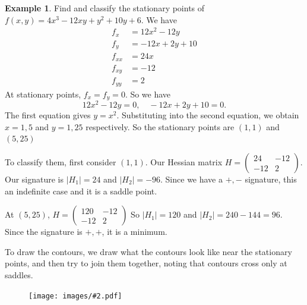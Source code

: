 \documentclass[a4paper]{article}
\theoremstyle{definition}
\newtheorem*{eg}{Example}
\newcommand{\img}[2][]{\begin{figure}[ht]\centering\texttt{[image: images/\#2.pdf]}\end{figure}}
\begin{document}
\begin{eg}
  Find and classify the stationary points of $f(x, y) = 4x^3 - 12xy + y^2 + 10y + 6$. We have
  \begin{align*}
    f_x &= 12x^2 - 12y\\
    f_y &= -12x + 2y + 10\\
    f_{xx} &= 24x\\
    f_{xy} &= -12\\
    f_{yy} &= 2
  \end{align*}
  At stationary points, $f_x = f_y = 0$. So we have
  \[
  12x^2 - 12y = 0,\quad -12x + 2y + 10 = 0.
  \]
  The first equation gives $y = x^2$. Substituting into the second equation, we obtain $x = 1, 5$ and $y = 1, 25$ respectively. So the stationary points are $(1, 1)$ and $(5, 25)$

  To classify them, first consider $(1, 1)$. Our Hessian matrix $H = 
  \begin{pmatrix}
    24 & -12\\
    -12 & 2
  \end{pmatrix}$. Our signature is $|H_1| = 24$ and $|H_2| = -96$. Since we have a $+, -$ signature, this an indefinite case and it is a saddle point.

  At $(5, 25)$, $H = 
  \begin{pmatrix}
    120 & -12\\
    -12 & 2
  \end{pmatrix}$
  So $|H_1| = 120$ and $|H_2| = 240 - 144 = 96$. Since the signature is $+, +$, it is a minimum.

  To draw the contours, we draw what the contours look like near the stationary points, and then try to join them together, noting that contours cross only at saddles.
  \img[width=250pt]{de_23} %
\end{eg}
\end{document}
